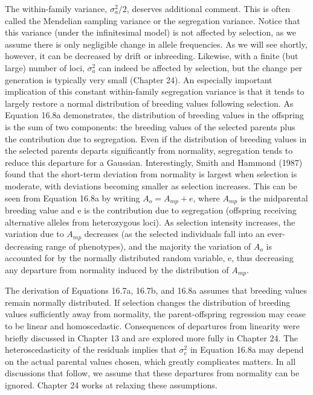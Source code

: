 \documentclass{article}
\begin{document}
The within-family variance,  $ \sigma_a^2/2 $, deserves additional comment. This is often called the Mendelian sampling variance or the segregation variance. Notice that this variance (under the infinitesimal model) is not affected by selection, as we assume there is only negligible change in allele frequencies. As we will see shortly, however, it can be decreased by drift or inbreeding. Likewise, with a finite (but large) number of loci,  $ \sigma_a^2 $ can indeed be affected by selection, but the change per generation is typically very small (Chapter 24). An especially important implication of this constant within-family segregation variance is that it tends to largely restore a normal distribution of breeding values following selection. As Equation 16.8a demonstrates, the distribution of breeding values in the offspring is the sum of two components: the breeding values of the selected parents plus the contribution due to segregation. Even if the distribution of breeding values in the selected parents departs significantly from normality, segregation tends to reduce this departure for a Gaussian. Interestingly, Smith and Hammond (1987) found that the short-term deviation from normality is largest when selection is moderate, with deviations becoming smaller as selection increases. This can be seen from Equation 16.8a by writing  $ A_o = A_{mp} + e $, where  $ A_{mp} $ is the midparental breeding value and e is the contribution due to segregation (offspring receiving alternative alleles from heterozygous loci). As selection intensity increases, the variation due to  $ A_{mp} $ decreases (as the selected individuals fall into an ever-decreasing range of phenotypes), and the majority the variation of  $ A_o $ is accounted for by the normally distributed random variable, e, thus decreasing any departure from normality induced by the distribution of  $ A_{mp} $.

The derivation of Equations 16.7a, 16.7b, and 16.8a assumes that breeding values remain normally distributed. If selection changes the distribution of breeding values sufficiently away from normality, the parent-offspring regression may cease to be linear and homoscedastic. Consequences of departures from linearity were briefly discussed in Chapter 13 and are explored more fully in Chapter 24. The heteroscedasticity of the residuals implies that  $ \sigma_{e}^{2} $ in Equation 16.8a may depend on the actual parental values chosen, which greatly complicates matters. In all discussions that follow, we assume that these departures from normality can be ignored. Chapter 24 works at relaxing these assumptions.
\end{document}
